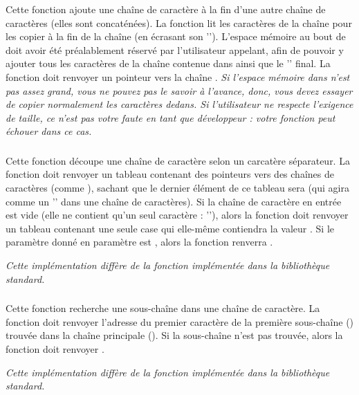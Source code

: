 \noindent Cette fonction ajoute une chaîne de caractère à la fin d'une autre chaîne de caractères (elles sont concaténées).
La fonction lit les caractères de la chaîne  pour les copier à la fin de la chaîne  (en écrasant son '').
L'espace mémoire au bout de  doit avoir été préalablement réservé par l'utilisateur appelant, afin de pouvoir y ajouter tous les caractères de la chaîne contenue dans  ainsi que le '' final.
La fonction doit renvoyer un pointeur vers la chaîne .
\textit{Si l'espace mémoire dans  n'est pas assez grand, vous ne pouvez pas le savoir à l'avance, donc, vous devez essayer de copier normalement les caractères dedans. Si l'utilisateur ne respecte l'exigence de taille, ce n'est pas votre faute en tant que développeur : votre fonction peut échouer dans ce cas.}


\subsubsection*{}

\noindent Cette fonction découpe une chaîne de caractère selon un carcatère séparateur.
La fonction doit renvoyer un tableau contenant des pointeurs vers des chaînes de caractères (comme ), sachant que le dernier élément de ce tableau sera  (qui agira comme un '' dans une chaîne de caractères).
Si la chaîne de caractère en entrée est vide (elle ne contient qu'un seul caractère : ''), alors la fonction doit renvoyer un tableau contenant une seule case qui elle-même contiendra la valeur .
Si le paramètre donné en paramètre est , alors la fonction renverra .

\noindent \textit{Cette implémentation diffère de la fonction  implémentée dans la bibliothèque standard.}


\subsubsection*{}

\noindent Cette fonction recherche une sous-chaîne dans une chaîne de caractère.
La fonction doit renvoyer l'adresse du premier caractère de la première sous-chaîne () trouvée dans la chaîne principale ().
Si la sous-chaîne n'est pas trouvée, alors la fonction doit renvoyer .

\noindent \textit{Cette implémentation diffère de la fonction  implémentée dans la bibliothèque standard.}
